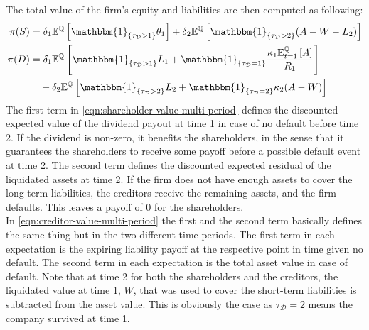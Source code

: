 \documentclass[main.tex]{subfiles}
\begin{document}
        The total value of the firm's equity and liabilities are then computed as following:
        \begin{align}
            \pi(S)&=
            \delta_1 
            \mathbb{E}^{\rnmeasure}\left[
                \mathbbm{1}_{\{\tau_{\mathcal{D}}>1\}} \theta_1\right]
                +
                \delta_2 \mathbb{E}^{\rnmeasure}\left[\mathbbm{1}_{\{\tau_{\mathcal{D}}>2\}} (A-W-L_{2})
            \right]
            \label{eqn:shareholder-value-multi-period}
            \\
            \nonumber
            \pi(D)&=
            \delta_1
            \mathbb{E}^{\rnmeasure}\left[
                \mathbbm{1}_{\{\tau_{\mathcal{D}}>1\}} L_1 + \mathbbm{1}_{\{\tau_{\mathcal{D}}=1\}} 
                \frac{
                    \kappa_1 \mathbb{E}_{t=1}^{\rnmeasure}\left[A\right]
                }{
                    R_1
                }
            \right]
            \\
            &\quad+
            \delta_2
            \mathbb{E}^{\rnmeasure}\left[
                \mathbbm{1}_{\{\tau_{\mathcal{D}}>2\}}L_{2}
                +
                \mathbbm{1}_{\{\tau_{\mathcal{D}}=2\}}\kappa_{2}(A-W)
            \right]
            \label{eqn:creditor-value-multi-period}
        \end{align}
        The first term in \cref{eqn:shareholder-value-multi-period} defines the discounted expected value of the dividend payout at time 1 in case of no default before time 2.
        If the dividend is non-zero, it benefits the shareholders,
        in the sense that it guarantees the shareholders to receive some payoff before a possible default event at time 2.
        The second term defines the discounted expected residual of the liquidated assets at time 2.
        If the firm does not have enough assets to cover the long-term liabilities, the creditors receive the remaining assets, and the firm defaults.
        This leaves a payoff of 0 for the shareholders.
        \\
        In \cref{eqn:creditor-value-multi-period} the first and the second term basically defines the same thing but in the two different time periods.
        The first term in each expectation is the expiring liability payoff at the respective point in time given no default. The second term in each expectation is the total asset value in case of default. Note that at time 2 for both the shareholders and the creditors, the liquidated value at time 1, $W$, that was used to cover the short-term liabilities is subtracted from the asset value. This is obviously the case as $\tau_{\mathcal{D}}=2$ means the company survived at time 1.
\end{document}
